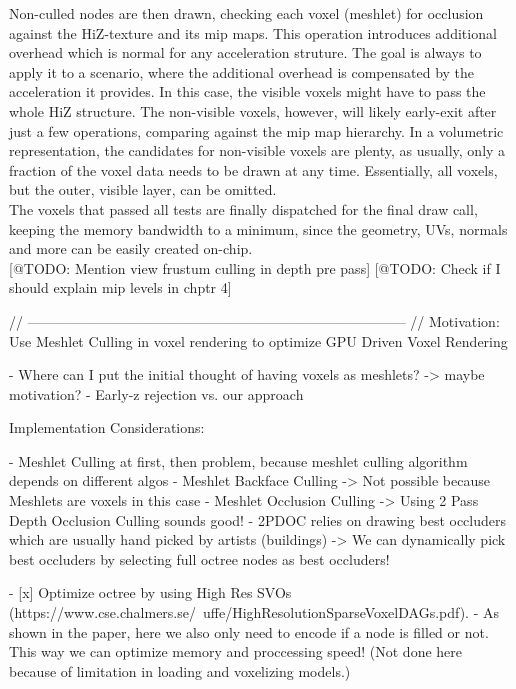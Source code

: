Non-culled nodes are then drawn, checking each voxel (meshlet) for occlusion against the \ac{HiZ}-texture and its mip maps. 
This operation introduces additional overhead which is normal for any acceleration struture. The goal is always to apply it 
to a scenario, where the additional overhead is compensated by the acceleration it provides. In this case, the visible voxels 
might have to pass the whole \ac{HiZ} structure. The non-visible voxels, however, will likely early-exit after just a few 
operations, comparing against the mip map hierarchy. In a volumetric representation, the candidates for non-visible voxels 
are plenty, as usually, only a fraction of the voxel data needs to be drawn at any time. Essentially, all voxels, but the 
outer, visible layer, can be omitted.\\

\noindent
The voxels that passed all tests are finally dispatched for the final draw call, keeping the memory bandwidth to a minimum, 
since the geometry, UVs, normals and more can be easily created on-chip. \\



[@TODO: Mention view frustum culling in depth pre pass]
[@TODO: Check if I should explain mip levels in chptr 4]


// --------------------------------------------------------------------------------- //
Motivation:
Use Meshlet Culling in voxel rendering to optimize GPU Driven Voxel Rendering

- Where can I put the initial thought of having voxels as meshlets? -> maybe motivation? 
- Early-z rejection vs. our approach

Implementation Considerations:

- Meshlet Culling at first, then problem, because meshlet culling algorithm depends on different algos
    - Meshlet Backface Culling -> Not possible because Meshlets are voxels in this case
    - Meshlet Occlusion Culling -> Using 2 Pass Depth Occlusion Culling sounds good!
    - 2PDOC relies on drawing best occluders which are usually hand picked by artists (buildings)
        -> We can dynamically pick best occluders by selecting full octree nodes as best occluders!

- [x] Optimize octree by using High Res SVOs (https://www.cse.chalmers.se/~uffe/HighResolutionSparseVoxelDAGs.pdf).
    - As shown in the paper, here we also only need to encode if a node is filled or not. This way we can 
    optimize memory and proccessing speed! (Not done here because of limitation in loading and voxelizing models.)

